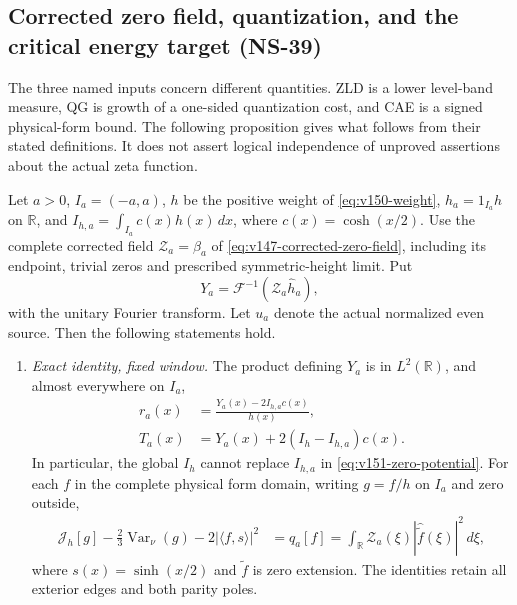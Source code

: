 \subsection*{Corrected zero field, quantization, and the critical energy target (NS-39)}
\label{sec:v151-input-comparison}
The three named inputs concern different quantities. ZLD is a lower
level-band measure, QG is growth of a one-sided quantization cost, and
CAE is a signed physical-form bound. The following proposition gives
what follows from their stated definitions. It does not assert logical
independence of unproved assertions about the actual zeta function.

\begin{proposition}
\label{prop:v151-input-comparison}
Let $a>0$, $I_a=(-a,a)$, $h$ be the positive weight of
\eqref{eq:v150-weight}, $h_a=1_{I_a}h$ on $\mathbb R$, and
$I_{h,a}=\int_{I_a}c(x)h(x)\,dx$, where $c(x)=\cosh(x/2)$.
Use the complete corrected field $\mathcal Z_a=\beta_a$ of
\eqref{eq:v147-corrected-zero-field}, including its endpoint, trivial
zeros and prescribed symmetric-height limit. Put
\[
 Y_a=\mathcal F^{-1}(\mathcal Z_a\widehat h_a),
\]
with the unitary Fourier transform. Let $u_a$ denote the actual normalized
even source. Then the following statements hold.
\begin{enumerate}[label=(\roman*)]
\item \emph{Exact identity, fixed window.} The product defining $Y_a$
is in $L^2(\mathbb R)$, and almost everywhere on $I_a$,
\begin{align}
 r_a(x)&=\frac{Y_a(x)-2I_{h,a}c(x)}{h(x)},
       \label{eq:v151-zero-potential}\\
 T_a(x)&=Y_a(x)+2(I_h-I_{h,a})c(x).
       \label{eq:v151-zero-exterior}
\end{align}
In particular, the global $I_h$ cannot replace $I_{h,a}$ in
\eqref{eq:v151-zero-potential}. For each $f$ in the complete physical
form domain, writing $g=f/h$ on $I_a$ and zero outside,
\begin{align}
 \mathcal J_h[g]-\tfrac23\operatorname{Var}_{\nu}(g)
              -2|\langle f,s\rangle|^2
 &=q_a[f]
 =\int_{\mathbb R}\mathcal Z_a(\xi)
                   |\widehat{\widetilde f}(\xi)|^2\,d\xi,
 \label{eq:v151-zero-energy}
\end{align}
where $s(x)=\sinh(x/2)$ and $\widetilde f$ is zero extension.
The identities retain all exterior edges and both parity poles.


\end{enumerate}
\end{proposition}
